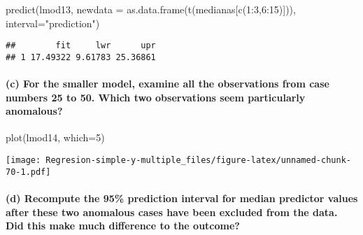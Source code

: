 \documentclass[
]{article}
\newenvironment{Shaded}{\begin{snugshade}}{\end{snugshade}}
\newcommand{\AttributeTok}[1]{\textcolor[rgb]{0.77,0.63,0.00}{#1}}
\newcommand{\DecValTok}[1]{\textcolor[rgb]{0.00,0.00,0.81}{#1}}
\newcommand{\FunctionTok}[1]{\textcolor[rgb]{0.00,0.00,0.00}{#1}}
\newcommand{\NormalTok}[1]{#1}
\newcommand{\SpecialCharTok}[1]{\textcolor[rgb]{0.00,0.00,0.00}{#1}}
\newcommand{\StringTok}[1]{\textcolor[rgb]{0.31,0.60,0.02}{#1}}
\begin{document}
\begin{Shaded}
\begin{Highlighting}[]
\FunctionTok{predict}\NormalTok{(lmod13, }\AttributeTok{newdata =} \FunctionTok{as.data.frame}\NormalTok{(}\FunctionTok{t}\NormalTok{(medianas[}\FunctionTok{c}\NormalTok{(}\DecValTok{1}\SpecialCharTok{:}\DecValTok{3}\NormalTok{,}\DecValTok{6}\SpecialCharTok{:}\DecValTok{15}\NormalTok{)])), }\AttributeTok{interval=}\StringTok{"prediction"}\NormalTok{)}
\end{Highlighting}
\end{Shaded}

\begin{verbatim}
##        fit     lwr      upr
## 1 17.49322 9.61783 25.36861
\end{verbatim}

\hypertarget{c-for-the-smaller-model-examine-all-the-observations-from-case-numbers-25-to-50.-which-two-observations-seem-particularly-anomalous}{%
\paragraph{(c) For the smaller model, examine all the observations from
case numbers 25 to 50. Which two observations seem particularly
anomalous?}\label{c-for-the-smaller-model-examine-all-the-observations-from-case-numbers-25-to-50.-which-two-observations-seem-particularly-anomalous}}

\begin{Shaded}
\begin{Highlighting}[]
\FunctionTok{plot}\NormalTok{(lmod14, }\AttributeTok{which=}\DecValTok{5}\NormalTok{)}
\end{Highlighting}
\end{Shaded}

\texttt{[image: Regresion-simple-y-multiple\_files/figure-latex/unnamed-chunk-70-1.pdf]}

\hypertarget{d-recompute-the-95-prediction-interval-for-median-predictor-values-after-these-two-anomalous-cases-have-been-excluded-from-the-data.-did-this-make-much-difference-to-the-outcome}{%
\paragraph{(d) Recompute the 95\% prediction interval for median
predictor values after these two anomalous cases have been excluded from
the data. Did this make much difference to the
outcome?}\label{d-recompute-the-95-prediction-interval-for-median-predictor-values-after-these-two-anomalous-cases-have-been-excluded-from-the-data.-did-this-make-much-difference-to-the-outcome}}
\end{document}
